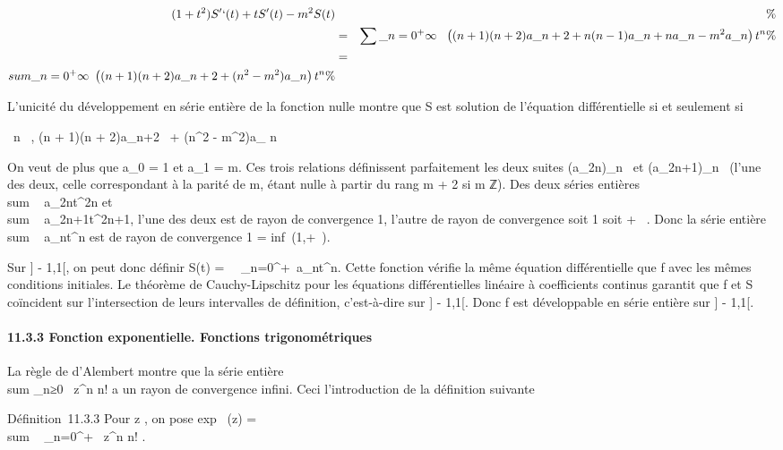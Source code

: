 \documentclass[]{article}
\begin{document}
\begin{align*} (1 + t^2)S'`(t) + tS'(t) -
m^2S(t)&& \%& \\ & =&
\sum \_n=0^+\infty~~\left
((n + 1)(n + 2)a\_ n+2 + n(n - 1)a\_n + na\_n -
m^2a\_ n\right )t^n\%&
\\ & =& \\sum
\_n=0^+\infty~\left ((n + 1)(n + 2)a\_
n+2 + (n^2 - m^2)a\_
n\right )t^n \%&
\\ \end{align*}

L'unicité du développement en série entière de la fonction nulle montre
que S est solution de l'équation différentielle si et seulement si~

\forall~n \in {}~, (n + 1)(n + 2)a\_n+2~ +
(n^2 - m^2)a\_ n

On veut de plus que a\_0 = 1 et a\_1 = m. Ces trois
relations définissent parfaitement les deux suites
(a\_2n)\_n\in{}~ et (a\_2n+1)\_n\in{}~ (l'une
des deux, celle correspondant à la parité de m, étant nulle à partir du
rang \textbar{}m\textbar{} + 2 si m \in ℤ). Des deux séries entières
\\sum ~
a\_2nt^2n et
\\sum ~
a\_2n+1t^2n+1, l'une des deux est de rayon de
convergence 1, l'autre de rayon de convergence soit 1 soit + \infty~. Donc la
série entière \\sum ~
a\_nt^n est de rayon de convergence 1
= inf~(1,+\infty~).

Sur {]} - 1,1{[}, on peut donc définir S(t) =\
\sum ~
\_n=0^+\infty~a\_nt^n. Cette fonction vérifie
la même équation différentielle que f avec les mêmes conditions
initiales. Le théorème de Cauchy-Lipschitz pour les équations
différentielles linéaire à coefficients continus garantit que f et S
coïncident sur l'intersection de leurs intervalles de définition,
c'est-à-dire sur {]} - 1,1{[}. Donc f est développable en série entière
sur {]} - 1,1{[}.

\paragraph{11.3.3 Fonction exponentielle. Fonctions trigonométriques}

La règle de d'Alembert montre que la série entière
\\sum  \_n≥0~
z^n \over n! a un rayon de convergence
infini. Ceci \jmathustifie l'introduction de la définition suivante

Définition~11.3.3 Pour z \in {}, on pose exp~ (z)
= \\sum ~
\_n=0^+\infty~ z^n \over n! .
\end{document}
